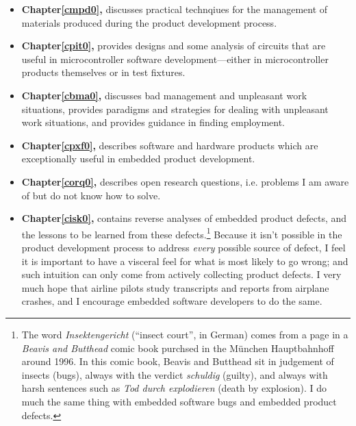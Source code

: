 \documentclass[letterpaper,10pt,titlepage]{custbook}
\begin{document}
\begin{itemize}
\item \textbf{Chapter\;\ref{cmpd0}, \cmpdzerotitle{}} discusses practical technqiues for
      the management of materials produced during the product development process.

\item \textbf{Chapter\;\ref{cpit0}, \cpitzerotitle{}} provides designs and some
      analysis of circuits that are useful in microcontroller software 
	  development---either in microcontroller products themselves or in
	  test fixtures.

\item \textbf{Chapter\;\ref{cbma0}, \cbmazerotitle{}} discusses
      bad management and unpleasant work situations, provides paradigms
      and strategies for dealing with unpleasant work situations, and provides
	  guidance in finding employment.

\item \textbf{Chapter\;\ref{cpxf0}, \cpxfzerotitle{}} describes software and
      hardware products which are exceptionally useful in embedded product development.

\item \textbf{Chapter\;\ref{corq0}, \corqzerotitle{}} describes open research
      questions, i.e. problems I am aware of but do not know how to solve.

\item \textbf{Chapter\;\ref{cisk0}, \ciskzerotitle{}} contains reverse analyses of 
      embedded product defects, and the lessons to be learned from these 
	  defects.\footnote{The word \emph{Insektengericht} (``insect court'', in German)
	  comes from a page in a \emph{Beavis and Butthead} comic book purchsed in 
	  the M\"unchen Hauptbahnhoff around 1996.  In this comic book, Beavis and 
	  Butthead sit in judgement of insects (bugs), always with the verdict 
	  \emph{schuldig} (guilty), and always with harsh sentences such as 
	  \emph{Tod durch explodieren} (death by explosion).  I do much the same 
	  thing with embedded software bugs and embedded product defects.}
	  Because it isn't possible in the product development process to address
	  \emph{every} possible source of defect, I feel it is important to
	  have a visceral feel for what is most likely to go wrong; and such
	  intuition can only come from actively collecting product defects.  I very much
	  hope that airline pilots study transcripts and reports from airplane crashes, and I
	  encourage embedded software developers to do the same.
\end{itemize}
\end{document}
